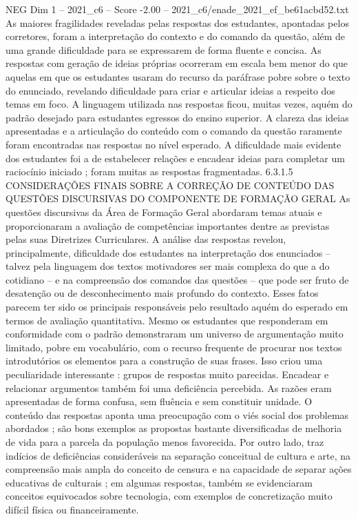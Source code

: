 \begin{textsample}{NEG Dim 1 – 2021\_c6 – Score -2.00 – 2021\_c6/enade\_2021\_ef\_be61acbd52.txt}
As maiores fragilidades reveladas pelas respostas dos estudantes, apontadas pelos corretores, foram a interpretação do contexto e do comando da questão, além de uma grande dificuldade para se expressarem de forma fluente e concisa.
As respostas com geração de ideias próprias ocorreram em escala bem menor do que aquelas em que os estudantes usaram do recurso da paráfrase pobre sobre o texto do enunciado, revelando dificuldade para criar e articular ideias a respeito dos temas em foco.
A linguagem utilizada nas respostas ficou, muitas vezes, aquém do padrão desejado para estudantes egressos do ensino superior.
A clareza das ideias apresentadas e a articulação do conteúdo com o comando da questão raramente foram encontradas nas respostas no nível esperado.
A dificuldade mais evidente dos estudantes foi a de estabelecer relações e encadear ideias para completar um raciocínio iniciado ; foram muitas as respostas fragmentadas. 6.3.1.5 CONSIDERAÇÕES FINAIS SOBRE A CORREÇÃO DE CONTEÚDO DAS QUESTÕES DISCURSIVAS DO COMPONENTE DE FORMAÇÃO GERAL As questões discursivas da Área de Formação Geral abordaram temas atuais e proporcionaram a avaliação de competências importantes dentre as previstas pelas suas Diretrizes Curriculares.
A análise das respostas revelou, principalmente, dificuldade dos estudantes na interpretação dos enunciados – talvez pela linguagem dos textos motivadores ser mais complexa do que a do cotidiano – e na compreensão dos comandos das questões – que pode ser fruto de desatenção ou de desconhecimento mais profundo do contexto.
Esses fatos parecem ter sido os principais responsáveis pelo resultado aquém do esperado em termos de avaliação quantitativa.
Mesmo os estudantes que responderam em conformidade com o padrão demonstraram um universo de argumentação muito limitado, pobre em vocabulário, com o recurso frequente de procurar nos textos introdutórios os elementos para a construção de suas frases.
Isso criou uma peculiaridade interessante : grupos de respostas muito parecidas.
Encadear e relacionar argumentos também foi uma deficiência percebida.
As razões eram apresentadas de forma confusa, sem fluência e sem constituir unidade.
O conteúdo das respostas aponta uma preocupação com o viés social dos problemas abordados ; são bons exemplos as propostas bastante diversificadas de melhoria de vida para a parcela da população menos favorecida.
Por outro lado, traz indícios de deficiências consideráveis na separação conceitual de cultura e arte, na compreensão mais ampla do conceito de censura e na capacidade de separar ações educativas de culturais ; em algumas respostas, também se evidenciaram conceitos equivocados sobre tecnologia, com exemplos de concretização muito difícil física ou financeiramente.

\end{textsample}
